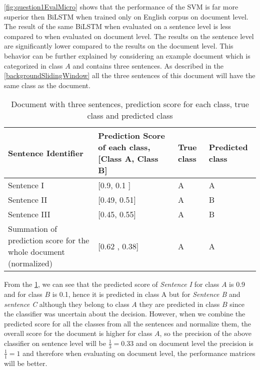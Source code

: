 


\ref{fig:question1EvalMicro} shows that the performance of the SVM is far more superior then \gls{BiLSTM} when trained only on English corpus on document level. The result of the same \gls{BiLSTM} when evaluated on a sentence level is less compared to when evaluated on document level. The results on the sentence level are significantly lower compared to the results on the document level. This behavior can be further explained by considering an example document which is categorized in class $A$ and contains three sentences. As described in the \ref{backgroundSlidingWindow} all the three sentences of this document will have the same class as the document.

\begin{table}[!ht]
\centering
\begin{tabular}{>{\centering\arraybackslash}m{3cm}>{\centering\arraybackslash}m{3cm}>{\centering\arraybackslash}m{3cm}>{\centering\arraybackslash}m{3cm}}
\hline
\textbf{Sentence Identifier} & \textbf{Prediction Score of each class, [Class A, Class B]} & \textbf{True class} & \textbf{Predicted class} \\ \hline
Sentence I & {[}0.9, 0.1 {]} & A & A \\[0.2cm]
Sentence II & {[}0.49, 0.51{]} & A & B \\[0.2cm]
Sentence III & {[}0.45, 0.55{]} & A & B \\ [0.2cm]\hline
Summation of prediction score for the whole document (normalized) & {[}0.62 , 0.38{]} & A & A
\end{tabular}
\captionsetup{justification=justified,margin=1cm}
\caption{Document with three sentences, prediction score for each class, true class and predicted class}
\label{table:SentVsDoc}
\end{table}

From the \ref{table:SentVsDoc}, we can see that the predicted score of \textit{Sentence I} for class $A$ is 0.9 and for class $B$ is 0.1, hence it is predicted in class A  but for \textit{Sentence B} and \textit{sentence C} although they belong to class $A$ they are predicted in class $B$ since the classifier was uncertain about the decision. However, when we combine the predicted score for all the classes from all the sentences and normalize them, the overall score for the document is higher for class $A$, so the precision of the above classifier on sentence level will be $\frac{1}{3} = 0.33$ and on document level the precision is $\frac{1}{1} = 1$ and therefore when evaluating on document level, the performance matrices will be better. 

